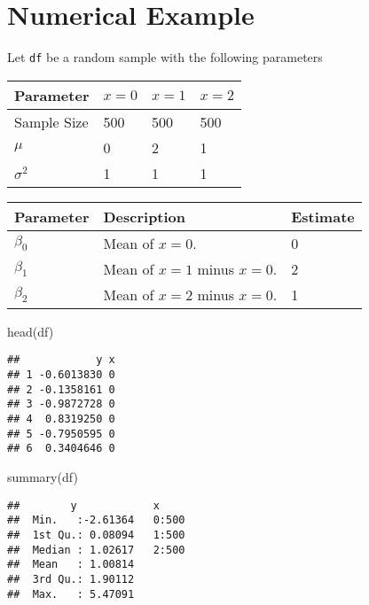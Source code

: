 \documentclass[
]{book}
\newenvironment{Shaded}{\begin{snugshade}}{\end{snugshade}}
\newcommand{\FunctionTok}[1]{\textcolor[rgb]{0.00,0.00,0.00}{#1}}
\newcommand{\NormalTok}[1]{#1}
\theoremstyle{definition}
\theoremstyle{definition}
\theoremstyle{definition}
\theoremstyle{remark}
\begin{document}
\hypertarget{numerical-example-1}{%
\section{Numerical Example}\label{numerical-example-1}}

Let \texttt{df} be a random sample with the following parameters

\begin{tabular}{l|l|l|l}
\hline
Parameter & $x = 0$ & $x = 1$ & $x = 2$\\
\hline
Sample Size & 500 & 500 & 500\\
\hline
$\mu$ & 0 & 2 & 1\\
\hline
$\sigma^2$ & 1 & 1 & 1\\
\hline
\end{tabular}

\begin{tabular}{l|l|l}
\hline
Parameter & Description & Estimate\\
\hline
$\beta_0$ & Mean of $x = 0$. & 0\\
\hline
$\beta_1$ & Mean of $x = 1$ minus $x = 0$. & 2\\
\hline
$\beta_2$ & Mean of $x = 2$ minus $x = 0$. & 1\\
\hline
\end{tabular}

\begin{Shaded}
\begin{Highlighting}[]
\FunctionTok{head}\NormalTok{(df)}
\end{Highlighting}
\end{Shaded}

\begin{verbatim}
##            y x
## 1 -0.6013830 0
## 2 -0.1358161 0
## 3 -0.9872728 0
## 4  0.8319250 0
## 5 -0.7950595 0
## 6  0.3404646 0
\end{verbatim}

\begin{Shaded}
\begin{Highlighting}[]
\FunctionTok{summary}\NormalTok{(df)}
\end{Highlighting}
\end{Shaded}

\begin{verbatim}
##        y            x      
##  Min.   :-2.61364   0:500  
##  1st Qu.: 0.08094   1:500  
##  Median : 1.02617   2:500  
##  Mean   : 1.00814          
##  3rd Qu.: 1.90112          
##  Max.   : 5.47091
\end{verbatim}
\end{document}
